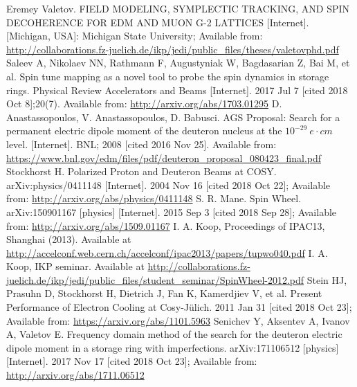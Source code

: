 \documentclass{article}
\begin{document}
\begin{thebibliography}{99}
  Eremey Valetov. FIELD MODELING, SYMPLECTIC TRACKING, AND SPIN DECOHERENCE FOR EDM AND MUON G-2 LATTICES [Internet]. [Michigan, USA]: Michigan State University; Available from: \url{http://collaborations.fz-juelich.de/ikp/jedi/public_files/theses/valetovphd.pdf}
  Saleev A, Nikolaev NN, Rathmann F, Augustyniak W, Bagdasarian Z, Bai M, et al. Spin tune mapping as a novel tool to probe the spin dynamics in storage rings. Physical Review Accelerators and Beams [Internet]. 2017 Jul 7 [cited 2018 Oct 8];20(7). Available from: \url{http://arxiv.org/abs/1703.01295}
  D. Anastassopoulos, V. Anastassopoulos, D. Babusci. AGS Proposal: Search for a permanent electric dipole moment of the deuteron nucleus at the $10^{−29}~e\cdot cm$ level. [Internet]. BNL; 2008 [cited 2016 Nov 25]. Available from: \url{https://www.bnl.gov/edm/files/pdf/deuteron_proposal_080423_final.pdf}
  Stockhorst H. Polarized Proton and Deuteron Beams at COSY. arXiv:physics/0411148 [Internet]. 2004 Nov 16 [cited 2018 Oct 22]; Available from: \url{http://arxiv.org/abs/physics/0411148}
  S. R. Mane. Spin Wheel. arXiv:150901167 [physics] [Internet]. 2015 Sep 3 [cited 2018 Sep 28]; Available from: \url{http://arxiv.org/abs/1509.01167}
  I. A. Koop, Proceedings of IPAC13, Shanghai (2013). Available at \url{http://accelconf.web.cern.ch/accelconf/ipac2013/papers/tupwo040.pdf}
  I. A. Koop, IKP seminar. Available at \url{http://collaborations.fz-juelich.de/ikp/jedi/public_files/student_seminar/SpinWheel-2012.pdf}
  Stein HJ, Prasuhn D, Stockhorst H, Dietrich J, Fan K, Kamerdjiev V, et al. Present Performance of Electron Cooling at Cosy-J\"ulich. 2011 Jan 31 [cited 2018 Oct 23]; Available from: \url{https://arxiv.org/abs/1101.5963}
  Senichev Y, Aksentev A, Ivanov A, Valetov E. Frequency domain method of the search for the deuteron electric dipole moment in a storage ring with imperfections. arXiv:171106512 [physics] [Internet]. 2017 Nov 17 [cited 2018 Oct 23]; Available from: \url{http://arxiv.org/abs/1711.06512}


\end{thebibliography}
\end{document}
